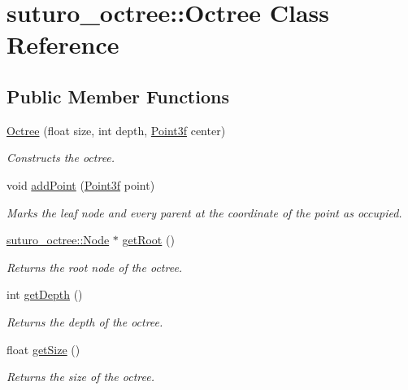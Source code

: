 \hypertarget{classsuturo__octree_1_1Octree}{\section{suturo\-\_\-octree\-:\-:Octree Class Reference}
\label{classsuturo__octree_1_1Octree}
}
\subsection*{Public Member Functions}
\begin{DoxyCompactItemize}
\item 
\hyperlink{classsuturo__octree_1_1Octree_a7d363eb4bbc6179098a03ea09a569711}{Octree} (float size, int depth, \hyperlink{structPoint3f}{Point3f} center)
\begin{DoxyCompactList}\small\item\em Constructs the octree. \end{DoxyCompactList}\item 
void \hyperlink{classsuturo__octree_1_1Octree_aa142de332240f77c5ed0b3911645f715}{add\-Point} (\hyperlink{structPoint3f}{Point3f} point)
\begin{DoxyCompactList}\small\item\em Marks the leaf node and every parent at the coordinate of the point as occupied. \end{DoxyCompactList}\item 
\hyperlink{classsuturo__octree_1_1Node}{suturo\-\_\-octree\-::\-Node} $\ast$ \hyperlink{classsuturo__octree_1_1Octree_a9a685337a49698151441ccca37067ca5}{get\-Root} ()
\begin{DoxyCompactList}\small\item\em Returns the root node of the octree. \end{DoxyCompactList}\item 
int \hyperlink{classsuturo__octree_1_1Octree_a2061177532684f240b75214e4b20e947}{get\-Depth} ()
\begin{DoxyCompactList}\small\item\em Returns the depth of the octree. \end{DoxyCompactList}\item 
float \hyperlink{classsuturo__octree_1_1Octree_aa3c6fced22f53e2ee09aad80595d9ff7}{get\-Size} ()
\begin{DoxyCompactList}\small\item\em Returns the size of the octree. \end{DoxyCompactList}\end{DoxyCompactItemize}
